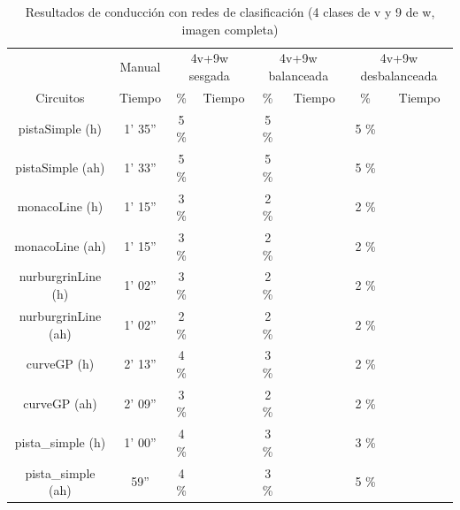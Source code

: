 \begin{table}[H]
\centering
\caption{Resultados de conducción con redes de clasificación (4 clases de v y 9 de w, imagen completa)}
\label{resultados_classificacion_completa_4v_9w}
\begin{tabular}{c|c|c|c|c|c|c|c|}
\cline{2-8}
                          & \multicolumn{1}{c|}{Manual} & \multicolumn{2}{c|}{4v+9w sesgada} & \multicolumn{2}{c|}{4v+9w balanceada} & \multicolumn{2}{c|}{4v+9w desbalanceada} \\ \cline{1-8} 
                        \multicolumn{1}{|c|}{Circuitos}    & Tiempo       & \%       & Tiempo       & \%        & Tiempo       & \%      & Tiempo     \\ \hline
\multicolumn{1}{|c|}{pistaSimple (h)}    & 1' 35''        & 5 \%         &           & 5 \%         &            & 5 \%        &       \\ \hline
\multicolumn{1}{|c|}{pistaSimple (ah)}     & 1' 33''           &  5 \%          &             & 5 \%           &           & 5 \%      & \\ \hline
\multicolumn{1}{|c|}{monacoLine (h)}      & 1' 15''           & 3 \%         &       & 2 \%     &         & 2 \%       &           \\ \hline
\multicolumn{1}{|c|}{monacoLine (ah)}       & 1' 15''            & 3 \%     &             & 2 \%           &       & 2 \%          &      \\ \hline
\multicolumn{1}{|c|}{nurburgrinLine (h)}      & 1' 02''            &  3 \%        &         & 2 \%        &       & 2 \%       &     \\ \hline
\multicolumn{1}{|c|}{nurburgrinLine (ah)}       & 1' 02''           & 2 \%         &           & 2 \%        &         & 2 \%       &       \\ \hline
\multicolumn{1}{|c|}{curveGP (h)}     & 2' 13''           & 4 \%      &            & 3 \%         &       & 2 \%       &       \\ \hline
\multicolumn{1}{|c|}{curveGP (ah)}       & 2' 09''            &  3 \%        &      & 2 \%    &        & 2 \%       &     \\ \hline
\multicolumn{1}{|c|}{pista\_simple (h)}       & 1' 00''           & 4 \%           &        & 3 \%      &     & 3 \%       &   \\ \hline
\multicolumn{1}{|c|}{pista\_simple (ah)}     & 59''            & 4 \%       &         & 3 \%         &       & 5 \%      &         \\ \hline
\end{tabular}
\end{table}

